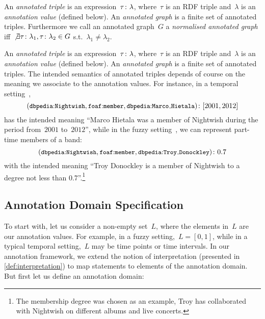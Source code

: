 \ifnormalisedardf%
\begin{definition}
  An \emph{annotated triple} is an expression~$\mbox{$\tau\colon\lambda$}$, where~$\tau$ is an \ac{RDF} triple and~$\lambda$
  is an \emph{annotation value} (defined below). An \emph{annotated graph} is a finite set of annotated triples.
  Furthermore we call an annotated graph~$G$ a \emph{normalised annotated graph}
  iff~$\not\exists\mbox{$\tau\colon\lambda_{1}$},\mbox{$\tau\colon\lambda_{2}$} \in G$ s.t.~$\lambda_{1}\neq\lambda_{2}$.
\end{definition}
% 
\else%
An \emph{annotated triple} is an expression~$\mbox{$\tau\colon\lambda$}$, where~$\tau$ is an \ac{RDF} triple and~$\lambda$
is an \emph{annotation value} (defined below). An \emph{annotated graph} is a finite set of annotated triples.
% 
\fi
%
The intended semantics of annotated triples depends of course on the meaning we associate to the annotation values. For
instance, in a temporal setting~\cite{GutierrezHurtadoVaisman:2007aa},
\[
\fuzzyg{\triple{\qname{dbpedia}{Nightwish}, \qname{foaf}{member}, \qname{dbpedia}{Marco\mathunderscore{}Hietala}}}{{[2001,2012]}}
\]
\nd has the intended meaning ``Marco Hietala was a member of Nightwish during the period from~$2001$ to~$2012$'',
% 
while in the fuzzy setting~\cite{Straccia:2009aa}, we can represent part-time members of a band:
\[
\fuzzyg{\triple{\qname{dbpedia}{Nightwish}, \qname{foaf}{member}, \qname{dbpedia}{Troy\mathunderscore{}Donockley}}}{0.7}
\]
\nd with the intended meaning ``Troy Donockley is a member of Nightwish to a degree not less than 0.7''.\footnote{The
  membership degree was chosen as an example, Troy has collaborated with Nightwish on different albums and live
  concerts.}


\subsection{Annotation Domain Specification}
\label{sec:rdfs-annot-doma}



To start with, let us consider a non-empty set~$L$, where the elements in~$L$ are our annotation values. For example, in
a fuzzy setting,~$L = [0,1]$, while in a typical temporal setting,~$L$ may be time points or time intervals.  In our
annotation framework, we extend the notion of interpretation (presented in \cref{def:interpretation}) to map
statements to elements of the annotation domain.  
%
But first let us define an annotation domain:




